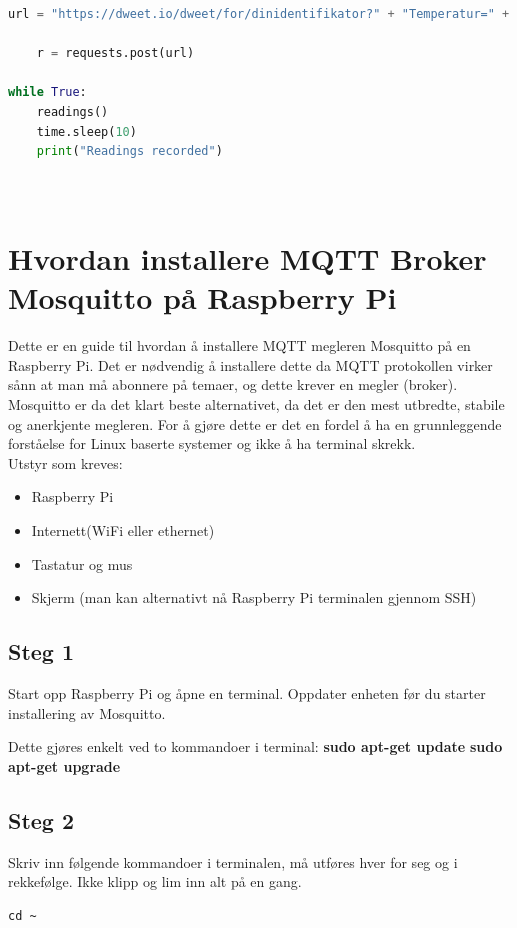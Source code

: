 \documentclass{article}
\begin{document}
\begin{appendices}
\begin{lstlisting}[language=Python, caption=Hvordan sende temperaturdata fra Raspberry Pi til Internett Fasit Kode]
	url = "https://dweet.io/dweet/for/dinidentifikator?" + "Temperatur=" + temp_str + "&Humidity=" + humidity_str + "&Pressure=" + pressure_str

	r = requests.post(url)

while True:
	readings()
	time.sleep(10)
	print("Readings recorded")

\end{lstlisting}

\newpage 
\section{\\Hvordan installere MQTT Broker Mosquitto på Raspberry Pi}
Dette er en guide til hvordan å installere MQTT megleren Mosquitto på en Raspberry Pi. Det er nødvendig å installere dette da MQTT protokollen virker sånn at man må abonnere på temaer, og dette krever en megler (broker). Mosquitto er da det klart beste alternativet, da det er den mest utbredte, stabile og anerkjente megleren. For å gjøre dette er det en fordel å ha en grunnleggende forståelse for Linux baserte systemer og ikke å ha terminal skrekk.
\\
Utstyr som kreves:
\begin{itemize}
	\item Raspberry Pi
	\item Internett(WiFi eller ethernet)
	\item Tastatur og mus
	\item Skjerm (man kan alternativt nå Raspberry Pi terminalen gjennom SSH)
\end{itemize}

\subsection{Steg 1}
Start opp Raspberry Pi og åpne en terminal. Oppdater enheten før du starter installering av Mosquitto. 

Dette gjøres enkelt ved to kommandoer i terminal:
	\textbf{sudo apt-get update}
	\textbf{sudo apt-get upgrade}

\subsection{Steg 2}
Skriv inn følgende kommandoer  i terminalen, må utføres hver for seg og i rekkefølge. Ikke klipp og lim inn alt på en gang.

\begin{verbatim}
cd ~


\end{verbatim}
\end{appendices}
\end{document}
